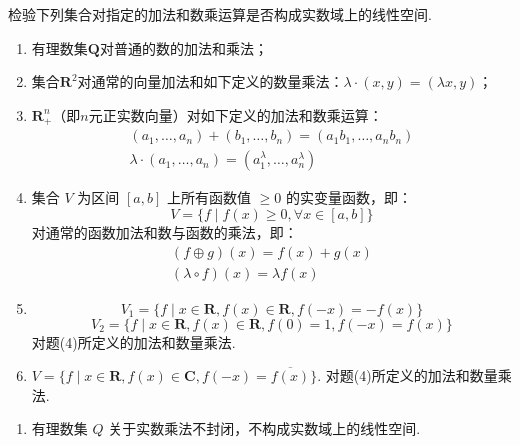 \begin{exercise}

    \begin{exgroup}
        \item 检验下列集合对指定的加法和数乘运算是否构成实数域上的线性空间.
        \begin{enumerate}
            \item 有理数集$\mathbf{Q}$对普通的数的加法和乘法；

            \item 集合$\mathbf{R}^2$对通常的向量加法和如下定义的数量乘法：$\lambda\cdot(x,y)=(\lambda x,y)$；

            \item $\mathbf{R}_+^n$（即$n$元正实数向量）对如下定义的加法和数乘运算：
                  \begin{gather*}
                      (a_1,\ldots,a_n)+(b_1,\ldots,b_n)=(a_1b_1,\ldots,a_nb_n) \\
                      \lambda\cdot(a_1,\ldots,a_n)=(a_1^\lambda,\ldots,a_n^\lambda)
                  \end{gather*}

            \item 集合 $V$ 为区间 $[a, b]$ 上所有函数值 $\geqslant 0$ 的实变量函数，即：
                  \[V=\{f \mid f(x) \geqslant 0, \forall x \in [a, b] \}\]
                  对通常的函数加法和数与函数的乘法，即：
                  \begin{gather*}
                      (f \oplus g)(x) = f(x) + g(x) \\
                      (\lambda \circ f)(x) = \lambda f(x)
                  \end{gather*}

            \item \[V_1= \{f \mid x \in \mathbf{R}, f(x) \in \mathbf{R}, f(-x)=-f(x)\}\]
                  \[V_2= \{f \mid x \in \mathbf{R}, f(x) \in \mathbf{R}, f(0)=1, f(-x)=f(x)\}\]
                  对题(4)所定义的加法和数量乘法.

            \item $V = \{f \mid x \in \mathbf{R}, f(x) \in \mathbf{C}, f(-x)= \overline{f(x)} \}$.
                  对题(4)所定义的加法和数量乘法.
        \end{enumerate}

        \begin{answer}
            \begin{enumerate}
                \item 有理数集 $Q$ 关于实数乘法不封闭，不构成实数域上的线性空间.


\end{enumerate}
\end{answer}
\end{exgroup}
\end{exercise}
